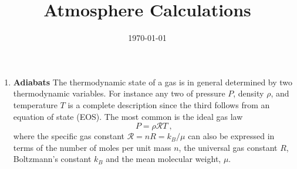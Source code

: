 \documentclass[11pt]{article}
\title{Atmosphere Calculations}
\date{\today}                                           %
\begin{document}
\maketitle
\begin{enumerate}
\item {\bf Adiabats} The thermodynamic state of a gas is in general determined by two thermodynamic variables.  For instance any two of pressure $P$, density $\rho$, and temperature $T$ is a complete description since the third follows from an equation of state (EOS).  The most common is the ideal gas law
\begin{equation}
P = \rho \mathcal{R} T ~,
\end{equation} 
where the specific gas constant $\mathcal{R} = n R = k_B/\mu$ can also be expressed in terms of the number of moles per unit mass $n$, the universal gas constant $R$, Boltzmann's constant $k_B$ and the mean molecular weight, $\mu$.


\end{enumerate}
\end{document}
